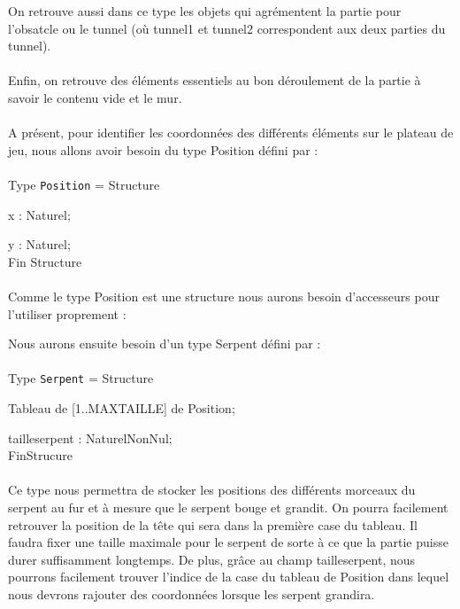 \documentclass[11pt,a4paper]{article}
\begin{document}
        On retrouve aussi dans ce type les objets qui agrémentent la partie pour l'obsatcle ou le tunnel (où tunnel1 et tunnel2 correspondent aux deux parties du tunnel).\\\\
        
        Enfin, on retrouve des éléments essentiels au bon déroulement de la partie à savoir le contenu vide et le mur.\\\\
        
        A présent, pour identifier les coordonnées des différents éléments sur le plateau de jeu, nous allons avoir besoin du type Position défini par : \\\\
        Type \verb|Position| = Structure 
        
            x : Naturel; 
            
            y : Naturel; \\            
        Fin Structure\\\\
        Comme le type Position est une structure nous aurons besoin d'accesseurs pour l'utiliser proprement :  
        
        \begin{algorithm}
        \end{algorithm}
        
        Nous aurons ensuite besoin d'un type Serpent défini par : \\\\
        Type \verb|Serpent| = Structure
        
                Tableau de [1..MAXTAILLE] de Position;
                
                tailleserpent : NaturelNonNul; \\
        FinStrucure\\\\
        Ce type nous permettra de stocker les positions des différents morceaux du serpent au fur et à mesure que le serpent bouge et grandit. On pourra facilement retrouver la position de la tête qui sera dans la première case du tableau. Il faudra fixer une taille maximale pour le serpent de sorte à ce que la partie puisse durer suffisamment longtemps. De plus, grâce au champ tailleserpent, nous pourrons facilement trouver l'indice de la case du tableau de Position dans lequel nous devrons rajouter des coordonnées lorsque les serpent grandira.\\
        
\end{document}
